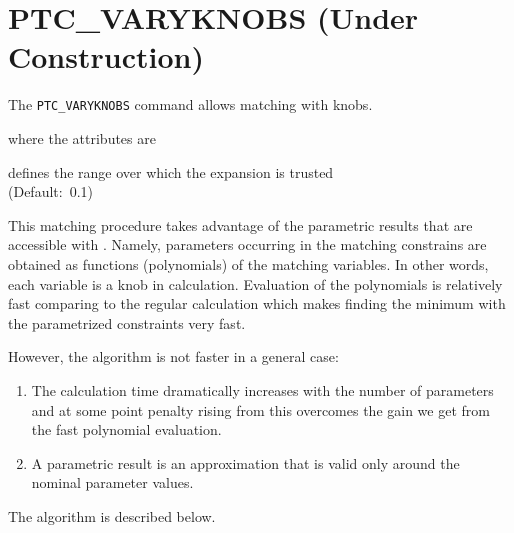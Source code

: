 % 


\section{PTC\_VARYKNOBS (Under Construction)}
\label{sec:ptc-varyknobs}

The \texttt{PTC\_VARYKNOBS} command allows matching with \ptc knobs.


where the attributes are
\begin{madlist}
   defines the range over which the expansion is
  trusted \\ (Default:~0.1)
\end{madlist}

This matching procedure takes advantage of the parametric results that
are accessible with \ptc. Namely, parameters occurring in the matching
constrains are obtained as functions (polynomials) of the matching
variables. In other words, each variable is a knob in \ptc
calculation. Evaluation of the polynomials is relatively fast comparing
to the regular \ptc calculation which makes finding the minimum with the
parametrized constraints very fast.  

However, the algorithm is not faster in a general case: 
\begin{enumerate}
   \item  The calculation time dramatically increases with the number of
     parameters and at some point penalty rising from this overcomes the
     gain we get from the fast polynomial evaluation.    
   \item  A parametric result is an approximation that is valid only
     around the nominal parameter values.     
\end{enumerate}

The algorithm is described below. \\
 

